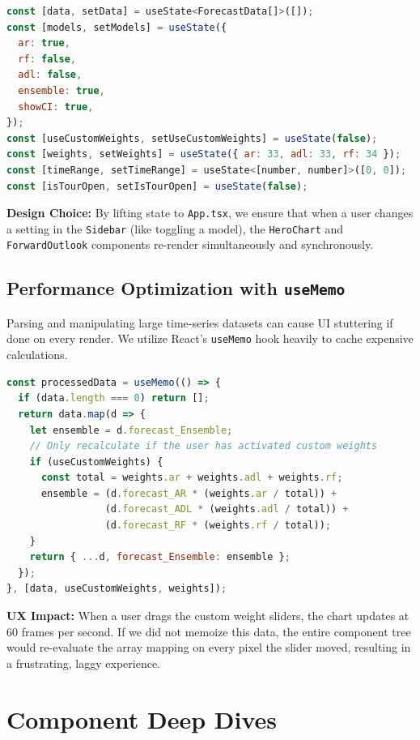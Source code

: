 \documentclass[12pt]{article}
\begin{document}
\begin{lstlisting}[language=JavaScript, caption=Core State Initialization]
const [data, setData] = useState<ForecastData[]>([]);
const [models, setModels] = useState({
  ar: true,
  rf: false,
  adl: false,
  ensemble: true,
  showCI: true,
});
const [useCustomWeights, setUseCustomWeights] = useState(false);
const [weights, setWeights] = useState({ ar: 33, adl: 33, rf: 34 });
const [timeRange, setTimeRange] = useState<[number, number]>([0, 0]);
const [isTourOpen, setIsTourOpen] = useState(false);
\end{lstlisting}

\textbf{Design Choice:} By lifting state to \texttt{App.tsx}, we ensure that when a user changes a setting in the \texttt{Sidebar} (like toggling a model), the \texttt{HeroChart} and \texttt{ForwardOutlook} components re-render simultaneously and synchronously.

\subsection{Performance Optimization with \texttt{useMemo}}
Parsing and manipulating large time-series datasets can cause UI stuttering if done on every render. We utilize React's \texttt{useMemo} hook heavily to cache expensive calculations.

\begin{lstlisting}[language=JavaScript, caption=Dynamic Ensemble Calculation]
const processedData = useMemo(() => {
  if (data.length === 0) return [];
  return data.map(d => {
    let ensemble = d.forecast_Ensemble;
    // Only recalculate if the user has activated custom weights
    if (useCustomWeights) {
      const total = weights.ar + weights.adl + weights.rf;
      ensemble = (d.forecast_AR * (weights.ar / total)) + 
                 (d.forecast_ADL * (weights.adl / total)) + 
                 (d.forecast_RF * (weights.rf / total));
    }
    return { ...d, forecast_Ensemble: ensemble };
  });
}, [data, useCustomWeights, weights]);
\end{lstlisting}

\textbf{UX Impact:} When a user drags the custom weight sliders, the chart updates at 60 frames per second. If we did not memoize this data, the entire component tree would re-evaluate the array mapping on every pixel the slider moved, resulting in a frustrating, laggy experience.

\section{Component Deep Dives}
\end{document}
